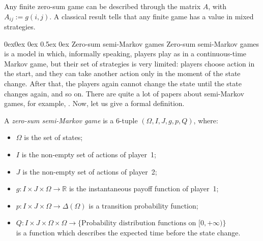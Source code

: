 \documentclass[english,openary,12pt]{article}
\makeatletter
\renewcommand\subsubsection{\@startsection{subsubsection}{3}{\z@}%
                                     {0ex\@plus 0ex \@minus 0ex}%
                                     {0.5ex \@plus 0ex}%
                                     {\normalfont\large\bfseries}}%
\theoremstyle{definition}
\newtheorem{example}{Example}
\newcommand{\R}{\mathbb{R}}
\makeatother
\begin{document}
Any finite zero-sum game can be described through the matrix $A$, 
with $A_{ij} := g(i, j)$. A classical result \cite{Neu28} tells that any 
finite game has a value in mixed strategies. 



\subsubsection{Zero-sum semi-Markov games}
\label{mm3}
Zero-sum semi-Markov games is a model in which, informally speaking, players 
play as in a continuous-time Markov game, but their set of strategies is very 
limited: players choose action in the start, and they can take another action 
only in the moment of the state change. After that, the players again cannot 
change the state until the state changes again, and so on. 
There are quite a lot of papers about semi-Markov games, for example, 
\cite{LalSin92}. Now, let us give a formal definition.

A \emph{zero-sum semi-Markov game} is a $6$-tuple 
$(\Omega, I, J, g, p, Q)$, where: 
\begin{itemize}
	\item $\Omega$ is the set of states;
	\item $I$ is the non-empty set of actions of player~1; 
	\item $J$ is the non-empty set of actions of player~2;
	\item $g : I \times J \times \Omega \to \R$ is the instantaneous payoff 
function of player~1;
	\item $p : I \times J \times \Omega \to \Delta(\Omega)$ is a transition 
probability function; 
	\item $Q : I \times J \times \Omega \times \Omega \to 
	\{\text{Probability distribution functions on } [0,+\infty)\}$\\
is a function which describes the expected time before the state change.
\end{itemize}
\end{document}
